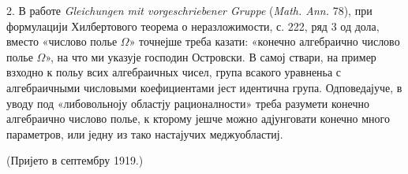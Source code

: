 ﻿\documentclass[11pt]{article}
\begin{document}
2. В работе \emph{Gleichungen mit vorgeschriebener Gruppe} (\emph{Math. Ann.} 78), при формулацији Хилбертового теорема о неразложимости, с. 222, ряд 3 од дола, вместо «числово полье \(\Omega\)» точнејше треба казати: «конечно алгебраично числово полье \(\Omega\)», на что ми указује господин Островски. В самој ствари, на пример взходно к польу всих алгебраичных чисел, група всакого уравненьа с алгебраичными числовыми коефициентами јест идентична група. Одповедајуче, в уводу под «либовольноју областју рационалности» треба разумети конечно алгебраично числово полье, к кторому јешче можно адјунговати конечно много параметров, или једну из тако настајучих меджуобластиј.

\begin{center}
(Пријето в септембру 1919.)
\end{center}
\end{document}
